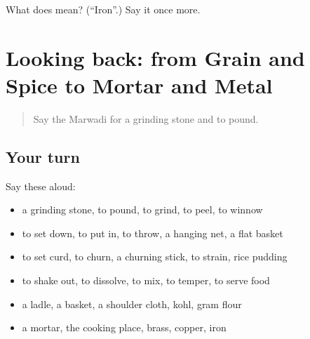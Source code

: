 \begin{tcolorbox}[breakable,colback=teal!4,colframe=teal!35!black,title={Before you move on}]
What does  mean? (\textquotedblleft{}Iron\textquotedblright{}.) Say it once more.
\end{tcolorbox}
\section[(dialogue)]{Looking back: from Grain and Spice to Mortar and Metal}

\label{lesson:MW-R184-review-179-184}



\begin{quote}
Say the Marwadi for a grinding stone and to pound.
\end{quote}

\subsection*{Your turn}
Say these aloud:

\begin{itemize}
\raggedright
  \item a grinding stone, to pound, to grind, to peel, to winnow
  \item to set down, to put in, to throw, a hanging net, a flat basket
  \item to set curd, to churn, a churning stick, to strain, rice pudding
  \item to shake out, to dissolve, to mix, to temper, to serve food
  \item a ladle, a basket, a shoulder cloth, kohl, gram flour
  \item a mortar, the cooking place, brass, copper, iron
\end{itemize}

